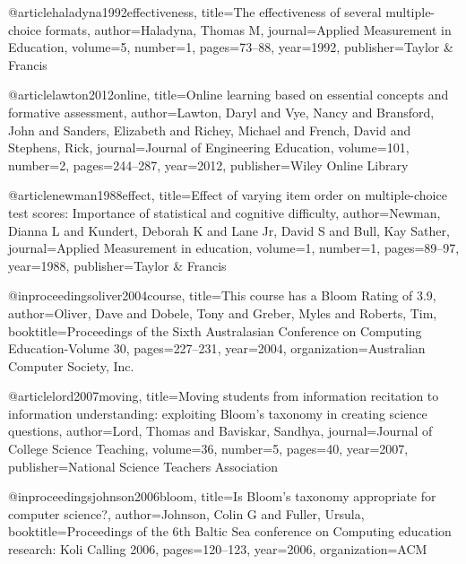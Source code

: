 @article{haladyna1992effectiveness,
  title={The effectiveness of several multiple-choice formats},
  author={Haladyna, Thomas M},
  journal={Applied Measurement in Education},
  volume={5},
  number={1},
  pages={73--88},
  year={1992},
  publisher={Taylor \& Francis}
}

@article{lawton2012online,
  title={Online learning based on essential concepts and formative assessment},
  author={Lawton, Daryl and Vye, Nancy and Bransford, John and Sanders, Elizabeth and Richey, Michael and French, David and Stephens, Rick},
  journal={Journal of Engineering Education},
  volume={101},
  number={2},
  pages={244--287},
  year={2012},
  publisher={Wiley Online Library}
}


@article{newman1988effect,
  title={Effect of varying item order on multiple-choice test scores: Importance of statistical and cognitive difficulty},
  author={Newman, Dianna L and Kundert, Deborah K and Lane Jr, David S and Bull, Kay Sather},
  journal={Applied Measurement in education},
  volume={1},
  number={1},
  pages={89--97},
  year={1988},
  publisher={Taylor \& Francis}
}

@inproceedings{oliver2004course,
  title={This course has a Bloom Rating of 3.9},
  author={Oliver, Dave and Dobele, Tony and Greber, Myles and Roberts, Tim},
  booktitle={Proceedings of the Sixth Australasian Conference on Computing Education-Volume 30},
  pages={227--231},
  year={2004},
  organization={Australian Computer Society, Inc.}
}

@article{lord2007moving,
  title={Moving students from information recitation to information understanding: exploiting Bloom's taxonomy in creating science questions},
  author={Lord, Thomas and Baviskar, Sandhya},
  journal={Journal of College Science Teaching},
  volume={36},
  number={5},
  pages={40},
  year={2007},
  publisher={National Science Teachers Association}
}

@inproceedings{johnson2006bloom,
  title={Is Bloom's taxonomy appropriate for computer science?},
  author={Johnson, Colin G and Fuller, Ursula},
  booktitle={Proceedings of the 6th Baltic Sea conference on Computing education research: Koli Calling 2006},
  pages={120--123},
  year={2006},
  organization={ACM}
}

